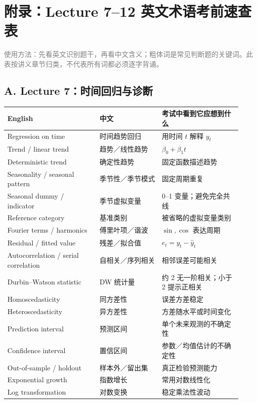 \documentclass[UTF8,fontset=fandol,10.5pt,a4paper]{ctexart}
\begin{document}
\section*{附录：Lecture 7--12 英文术语考前速查表}
\textcolor{graytext}{\small 使用方法：先看英文识别题干，再看中文含义；粗体词是常见判断题的关键词。此表按讲义章节归类，不代表所有词都必须逐字背诵。}

\subsection*{A. Lecture 7：时间回归与诊断}
\begin{longtable}{@{}p{0.37\linewidth}p{0.25\linewidth}p{0.32\linewidth}@{}}
\toprule English & 中文 & 考试中看到它应想到什么\\\midrule\endhead
Regression on time & 时间趋势回归 & 用时间 $t$ 解释 $y_t$\\
Trend / linear trend & 趋势／线性趋势 & $\beta_0+\beta_1t$\\
Deterministic trend & 确定性趋势 & 固定函数描述趋势\\
Seasonality / seasonal pattern & 季节性／季节模式 & 固定周期重复\\
Seasonal dummy / indicator & 季节虚拟变量 & 0--1 变量；避免完全共线\\
Reference category & 基准类别 & 被省略的虚拟变量类别\\
Fourier terms / harmonics & 傅里叶项／谐波 & $\sin,\cos$ 表达周期\\
Residual / fitted value & 残差／拟合值 & $e_t=y_t-\hat y_t$\\
Autocorrelation / serial correlation & 自相关／序列相关 & 相邻误差可能相关\\
Durbin--Watson statistic & DW 统计量 & 约 2 无一阶相关；小于 2 提示正相关\\
Homoscedasticity & 同方差性 & 误差方差稳定\\
Heteroscedasticity & 异方差性 & 方差随水平或时间变化\\
Prediction interval & 预测区间 & 单个未来观测的不确定性\\
Confidence interval & 置信区间 & 参数／均值估计的不确定性\\
Out-of-sample / holdout & 样本外／留出集 & 真正检验预测能力\\
Exponential growth & 指数增长 & 常用对数线性化\\
Log transformation & 对数变换 & 稳定乘法性波动\\
\bottomrule
\end{longtable}
\end{document}
